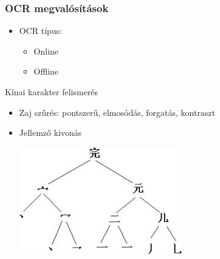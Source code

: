 \documentclass{beamer}
\begin{document}
\begin{frame}[fragile]
\frametitle{OCR megvalósítások}
\begin{itemize}
\item OCR típus:
\begin{itemize}
	\item Online
	\item Offline
\end{itemize}
\end{itemize}

{\large Kínai karakter felismerés}
\begin{itemize}
\item Zaj szűrés: pontszerű, elmosódás, forgatás, kontraszt
\item Jellemző kivonás

\includegraphics[scale=0.6, center]{ocr_features}
\end{itemize}


\end{frame}
\end{document}
